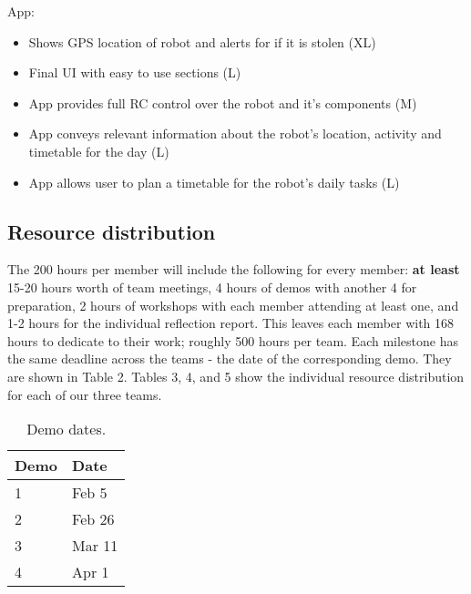\documentclass{article}
\begin{document}
App:
\begin{itemize}
\item Shows GPS location of robot and alerts for if it is stolen (XL)
\item Final UI with easy to use sections (L)
\item App provides full RC control over the robot and it's components (M)
\item App conveys relevant information about the robot's location, activity and timetable for the day (L)
\item App allows user to plan a timetable for the robot's daily tasks (L)
\end{itemize}


\subsection{Resource distribution}

The 200 hours per member will include the following for every member: {\bf at least} 15-20 hours worth of team meetings, 4 hours of demos with another 4 for preparation, 2 hours of workshops with each member attending at least one, and 1-2 hours for the individual reflection report. This leaves each member with 168 hours to dedicate to their work; roughly 500 hours per team. Each milestone has the same deadline across the teams - the date of the corresponding demo. They are shown in Table 2. Tables 3, 4, and 5 show the individual resource distribution for each of our three teams.
\begin{table}[]
  \begin{center}
  \begin{tabular}{ll}
    \hline
    Demo & Date   \\
    \hline
    1 & Feb 5 \\
    2 & Feb 26 \\
    3 & Mar 11 \\
    4 & Apr 1\\ \hline
  \end{tabular}
  \end{center}
  \caption{Demo dates.}
\end{table}
\end{document}
